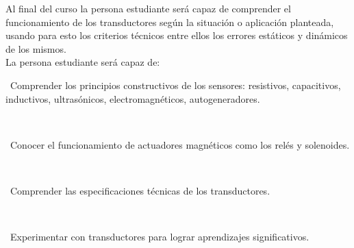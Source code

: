 \documentclass[letterpaper]{article}%
\begin{document}
\begin{tcolorbox}[
blanker,
width=0.78\textwidth,enlarge left by=0.24\textwidth,
before skip=6pt,
breakable,
overlay unbroken and first={%
    \node[inner sep=0pt,outer sep=0pt,text width=0.22\textwidth,
    align=none,
    below right]
    at ([xshift=-0.24\textwidth]frame.north west)
{
\hspace*{0mm}\fontsize{12}{14}\selectfont \textbf{\textcolor{parte}{3 Objetivos}}
};}]
Al final del curso la persona estudiante será capaz de comprender el funcionamiento de los transductores según la situación o aplicación planteada, usando para esto los criterios técnicos entre ellos los errores estáticos y dinámicos de los mismos.\\
La persona estudiante será capaz de:\\
\hspace*{0.02\linewidth}\parbox{0.98\linewidth}{\strut\textbullet\, Comprender los principios constructivos de los sensores: resistivos, capacitivos, inductivos, ultrasónicos, electromagnéticos, autogeneradores.
\strut}\\
\hspace*{0.02\linewidth}\parbox{0.98\linewidth}{\strut\textbullet\, Conocer el funcionamiento de actuadores magnéticos como los relés y solenoides.
\strut}\\
\hspace*{0.02\linewidth}\parbox{0.98\linewidth}{\strut\textbullet\, Comprender las especificaciones técnicas de los transductores.
\strut}\\
\hspace*{0.02\linewidth}\parbox{0.98\linewidth}{\strut\textbullet\, Experimentar con transductores para lograr aprendizajes significativos.\strut}\\
 
\end{tcolorbox}
%
\vspace*{10mm}%
\end{document}
